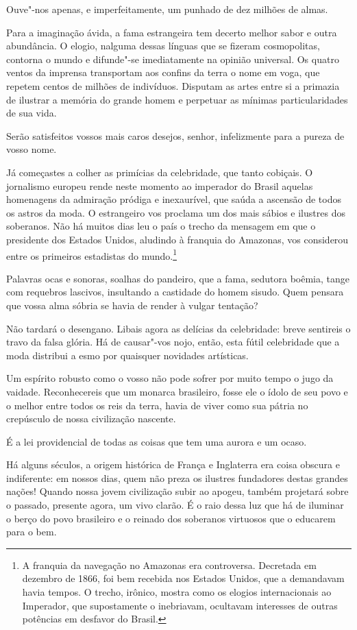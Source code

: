 \begin{linenumbers}
Ouve"-nos apenas, e imperfeitamente, um punhado de dez milhões de almas.

Para a imaginação ávida, a fama estrangeira tem decerto melhor sabor e
outra abundância. O elogio, nalguma dessas línguas que se fizeram
cosmopolitas, contorna o mundo e difunde"-se imediatamente na opinião
universal. Os quatro ventos da imprensa transportam aos confins da
terra o nome em voga, que repetem centos de milhões de indivíduos.
Disputam as artes entre si a primazia de ilustrar a memória do grande
homem e perpetuar as mínimas particularidades de sua vida.

Serão satisfeitos vossos mais caros desejos, senhor, infelizmente para a
pureza de vosso nome.

Já começastes a colher as primícias da celebridade, que tanto cobiçais.
O jornalismo europeu rende neste momento ao imperador do Brasil aquelas
homenagens da admiração pródiga e inexaurível, que saúda a ascensão de
todos os astros da moda. O estrangeiro vos proclama um dos mais sábios
e ilustres dos soberanos. Não há muitos dias leu o país o trecho da
mensagem em que o presidente dos Estados Unidos, aludindo à franquia do
Amazonas, vos considerou entre os primeiros estadistas do
mundo.\footnote{ A franquia da navegação no Amazonas era controversa. 
Decretada em dezembro de 1866, foi bem recebida nos Estados Unidos, 
que a demandavam havia tempos. O trecho, irônico, mostra como os elogios 
internacionais ao Imperador, que supostamente o inebriavam, ocultavam 
interesses de outras potências em desfavor do Brasil.}

Palavras ocas e sonoras, soalhas do pandeiro, que a fama, sedutora
boêmia, tange com requebros lascivos, insultando a castidade do homem
sisudo. Quem pensara que vossa alma sóbria se havia de render à vulgar tentação? 

Não tardará o desengano. Libais agora as delícias da celebridade: breve
sentireis o travo da falsa glória. Há de causar"-vos nojo, então, esta
fútil celebridade que a moda distribui a esmo por quaisquer novidades artísticas. 

Um espírito robusto como o vosso não pode sofrer por muito tempo o jugo
da vaidade. Reconhecereis que um monarca brasileiro, fosse ele o ídolo
de seu povo e o melhor entre todos os reis da terra, havia de viver
como sua pátria no crepúsculo de nossa civilização nascente. 

É a lei providencial de todas as coisas que tem uma aurora e um ocaso.

Há alguns séculos, a origem histórica de França e Inglaterra era coisa
obscura e indiferente: em nossos dias, quem não preza os ilustres
fundadores destas grandes nações! Quando nossa jovem civilização subir
ao apogeu, também projetará sobre o passado, presente agora, um vivo
clarão. É o raio dessa luz que há de iluminar o berço do povo
brasileiro e o reinado dos soberanos virtuosos que o educarem para o bem.

\end{linenumbers}

